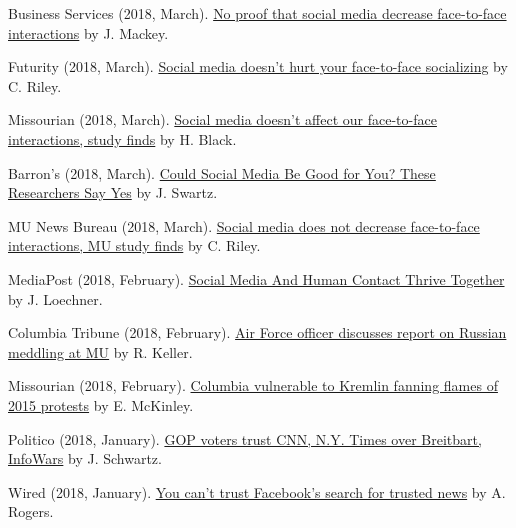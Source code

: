 \begin{bibenum}
    \item[] Business Services (2018, March).
      \href{http://businessservices24.com/44/no-proof-that-social-media-decrease-face-to-face-interactions/}{No proof that social media decrease face-to-face interactions} by J. Mackey.
    \item[] Futurity (2018, March).
      \href{http://www.futurity.org/social-media-social-interactions-1692872/}{Social media doesn’t hurt your face-to-face socializing} by C. Riley.
    \item[] Missourian (2018, March).
      \href{https://www.columbiamissourian.com/news/higher_education/social-media-doesn-t-affect-our-face-to-face-interactions/}{Social media doesn't affect our face-to-face interactions, study finds} by H. Black.
    \item[] Barron's (2018, March).
      \href{https://www.barrons.com/articles/could-social-media-be-good-for-you-these-researchers-say-yes-1519932207}{Could Social Media Be Good for You? These Researchers Say Yes} by J. Swartz.
    \item[] MU News Bureau (2018, March).
      \href{https://munews.missouri.edu/news-releases/2018/0301-social-media-does-not-decrease-face-to-face-interactions-mu-study-finds/}{Social media does not decrease face-to-face interactions, MU study finds} by C. Riley.
    \item[] MediaPost (2018, February).
      \href{https://mediapost.com/publications/article/315106/social-media-and-human-contact-thrive-together.html}{Social Media And Human Contact Thrive Together} by J. Loechner.
    \item[] Columbia Tribune (2018, February).
      \href{http://www.columbiatribune.com/news/20180217/air-force-officer-discusses-report-on-russian-meddling-at-mu}{Air Force officer discusses report on Russian meddling at MU} by R. Keller.
    \item[] Missourian (2018, February).
      \href{https://www.columbiamissourian.com/news/higher_education/columbia-vulnerable-to-kremlin-fanning-flames-of-protests/article_929cf366-11ad-11e8-9631-63ac0b4a6fd3.html}{Columbia vulnerable to Kremlin fanning flames of 2015 protests} by E. McKinley.
    \item[] Politico (2018, January).
      \href{https://www.politico.com/amp/story/2018/02/06/gop-republican-voters-media-bias-trusted-sites-393650}{ GOP voters trust CNN, N.Y. Times over Breitbart, InfoWars} by J. Schwartz.
    \item[] Wired (2018, January).
      \href{https://www.wired.com/story/you-cant-trust-facebooks-search-for-trusted-news/}{You can't trust Facebook's search for trusted news} by A. Rogers.

\end{bibenum}
